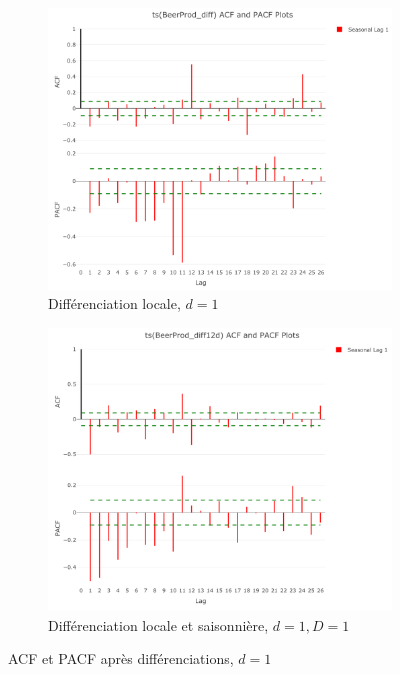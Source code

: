 \documentclass[12pt,a4paper]{book}
\newcommand{\1}{\mathds{1}}
\begin{document}
\begin{figure}[h]
\centering
	\begin{subfigure}{.4\textwidth}
    	\includegraphics[width=\textwidth]{d1D0}  
    	\caption{Différenciation locale, $d=1$}
    	\label{fig:sub1}
    \end{subfigure}
    \begin{subfigure}{.4\textwidth}
    	\includegraphics[width=\textwidth]{d1D1}  
    	\caption{Différenciation locale et saisonnière, $d=1, D=1$}
    	\label{fig:sub2}
    \end{subfigure}

\caption{ACF et PACF après différenciations, $d=1$}
\label{fig:2}
   
\end{figure}
\end{document}
